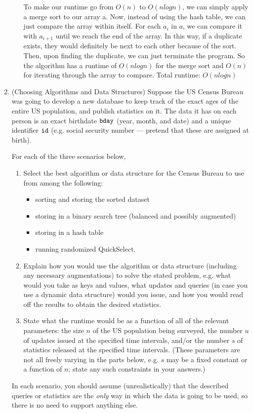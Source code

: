 \documentclass[11pt]{article}
\begin{document}
\begin{enumerate}
\begin{enumerate}
    \\\\ To make our runtime go from $O(n)$ to $O(nlogn)$, we can simply apply a merge sort to our array a. Now, instead of using the hash table, we can just compare the array within itself. For each $a_i$ in $a$, we can compare it with $a_{i+1}$ until we reach the end of the array. In this way, if a duplicate exists, they would definitely be next to each other because of the sort. Then, upon finding the duplicate, we can just terminate the program. So the algorithm has a runtime of $O(nlogn)$ for the merge sort and $O(n)$ for iterating through the array to compare. Total runtime: $O(nlogn)$

\end{enumerate}    
    

 \item (Choosing Algorithms and Data Structures)
     Suppose the US Census Bureau was going to develop a new database to keep track of the exact ages of the entire US population, and publish statistics on it.  The data it has on each person is an exact birthdate
    $\texttt{bday}$ (year, month, and date) and a unique identifier $\texttt{id}$ (e.g. social security number --- pretend that these are assigned at birth). 
    
    For each of the three scenarios below, 
    \begin{enumerate}
        \item Select the best algorithm or data structure for the Census Bureau to use from among the following: 
        \begin{itemize}
            \item sorting and storing the sorted dataset 
            \item storing in a binary search tree (balanced and possibly augmented)
            \item storing in a hash table
            \item running randomized QuickSelect. 
        \end{itemize}
        \item Explain how you would use the
        algorithm or data structure (including any necessary augmentations) to solve the stated problem, e.g. what would you take as keys and values, what updates and queries (in case you use a dynamic data structure) would you issue, and how you would read off the results to obtain the desired statistics. 
        \item State what the runtime would be as a function of all of the relevant parameters: the size $n$ of the US population being surveyed, the number $u$ of updates issued at the specified time intervals, and/or the number $s$ of statistics released at the specified time intervals.     (These parameters are not all freely varying in the parts below, e.g. $s$ may be a fixed constant or a function of $n$; state any such constraints in your answers.) 
    \end{enumerate}
    In each scenario, you should assume (unrealistically) that the described queries or statistics are the {\em only} way in which the data is going to be used, so there is no need to support anything else.
        

\end{enumerate}
\end{document}
